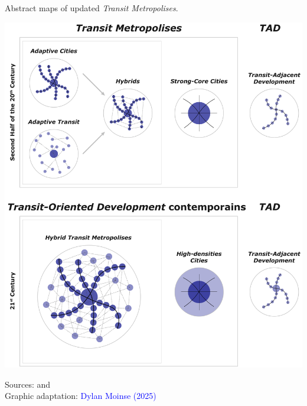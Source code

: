 \begin{refsegment}
\begin{carte}[h!]\vspace*{4pt}
    \caption{Abstract maps of updated \textsl{Transit Metropolises}.}
    \label{fig-chap1:schema-transit-metropolis}
    \centerline{\includegraphics[width=1\columnwidth]{src/Figures/Chap-1/EN_Schema_Alternative_cities_transit.pdf}}
    \vspace{5pt}
    \begin{flushright}\scriptsize{
    Sources: \textcolor{blue}{\textcite[3]{vos_influence_2014}} and \textcolor{blue}{\textcite[2]{liu_historical_2024}}
    \\
    Graphic adaptation: \textcolor{blue}{Dylan Moinse (2025)}
    }\end{flushright}
\end{carte}


\end{refsegment}
